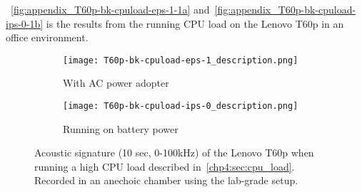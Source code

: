 ~\autoref{fig:appendix_T60p-bk-cpuload-eps-1-1a} and~\autoref{fig:appendix_T60p-bk-cpuload-ips-0-1b} is the results from the running CPU load on the Lenovo T60p in an office environment. 
\begin{figure}[ht]
	\begin{subfigure}{1\textwidth}
	    \centering
	    \texttt{[image: T60p-bk-cpuload-eps-1\_description.png]}
	    \caption{With AC power adopter}
	    \label{fig:appendix_T60p-bk-cpuload-eps-1-1a}
    \end{subfigure}
    \begin{subfigure}{1\textwidth}
	    \centering
	    \texttt{[image: T60p-bk-cpuload-ips-0\_description.png]}
	    \caption{Running on battery power}
	    \label{fig:appendix_T60p-bk-cpuload-ips-0-1b}
    \end{subfigure}
    \caption{Acoustic signature (10 sec, 0-100kHz) of the Lenovo T60p when running a high CPU load described in~\autoref{chp4:sec:cpu_load}. Recorded in an anechoic chamber using the lab-grade setup. }
	\label{fig:appendix_T60p-bk-cpuload}
\end{figure}


